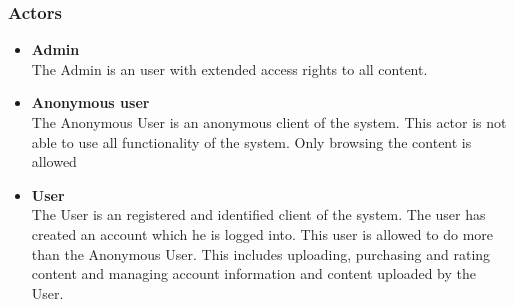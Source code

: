 %

\subsubsection{Actors}
\begin{itemize}
\item \textbf{Admin} \\
The Admin is an user with extended access rights to all content. 
\item \textbf{Anonymous user}\\ 
The Anonymous User is an anonymous client of the system. This actor is not able to use all functionality of the system. Only browsing the content is allowed
\item \textbf{User} \\
The User is an registered and identified client of the system. The user has created an account which he is logged into. This user is allowed to do more than the Anonymous User. This includes uploading, purchasing and rating content and managing account information and content uploaded by the User.
\end{itemize}

